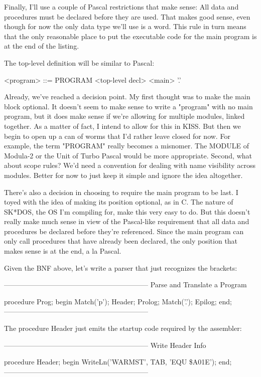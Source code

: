 \documentclass[float=false, crop=false]{standalone}
\begin{document}
Finally, I'll use a couple of Pascal restrictions that make sense: All data and
procedures must be declared before they are used. That makes good sense, even
though for now the only data type we'll use is a word. This rule in turn means
that the only reasonable place to put the executable code for the main program
is at the end of the listing.

The top-level definition will be similar to Pascal:


     <program> ::= PROGRAM <top-level decl> <main> '.'


Already, we've reached a decision point. My first thought was to make the main
block optional. It doesn't seem to make sense to write a "program" with no main
program, but it does make sense if we're allowing for multiple modules, linked
together. As a matter of fact, I intend to allow for this in KISS. But then we
begin to open up a can of worms that I'd rather leave closed for now. For
example, the term "PROGRAM" really becomes a misnomer. The MODULE of Modula-2 or
the Unit of Turbo Pascal would be more appropriate. Second, what about scope
rules? We'd need a convention for dealing with name visibility across modules.
Better for now to just keep it simple and ignore the idea altogether.

There's also a decision in choosing to require the main program to be last. I
toyed with the idea of making its position optional, as in C. The nature of
SK*DOS, the OS I'm compiling for, make this very easy to do. But this doesn't
really make much sense in view of the Pascal-like requirement that all data and
procedures be declared before they're referenced. Since the main program can
only call procedures that have already been declared, the only position that
makes sense is at the end, a la Pascal.

Given the BNF above, let's write a parser that just recognizes the brackets:

\begin{code}
{--------------------------------------------------------------}
{  Parse and Translate a Program }

procedure Prog;
begin
   Match('p');
   Header;
   Prolog;
   Match('.');
   Epilog;
end;
{--------------------------------------------------------------}
\end{code}

The procedure Header just emits the startup code required by the assembler:

\begin{code}
{--------------------------------------------------------------}
{ Write Header Info }

procedure Header;
begin
   WriteLn('WARMST', TAB, 'EQU \$A01E');
end;
{--------------------------------------------------------------}
\end{code}
\end{document}
